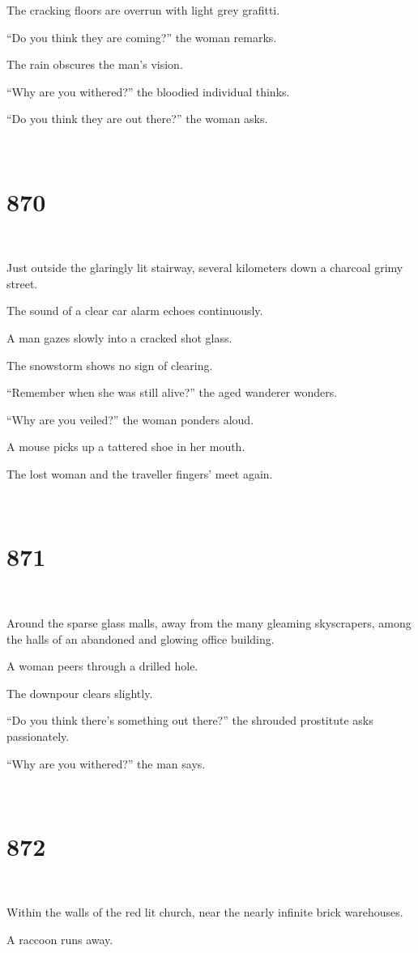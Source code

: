 \documentclass{report}
\begin{document}
The cracking floors are overrun with light grey grafitti.

``Do you think they are coming?'' the woman remarks.

The rain obscures the man's vision.

``Why are you withered?'' the bloodied individual thinks.

``Do you think they are out there?'' the woman asks.

~
\chapter*{870}
~

Just outside the glaringly lit stairway, several kilometers down a charcoal grimy street.

The sound of a clear car alarm echoes continuously.

A man gazes slowly into a cracked shot glass.

The snowstorm shows no sign of clearing.

``Remember when she was still alive?'' the aged wanderer wonders.

``Why are you veiled?'' the woman ponders aloud.

A mouse picks up a tattered shoe in her mouth.

The lost woman and the traveller fingers' meet again.

~
\chapter*{871}
~

Around the sparse glass malls, away from the many gleaming skyscrapers, among the halls of an abandoned and glowing office building.

A woman peers through a drilled hole.

The downpour clears slightly.

``Do you think there's something out there?'' the shrouded prostitute asks passionately.

``Why are you withered?'' the man says.

~
\chapter*{872}
~

Within the walls of the red lit church, near the nearly infinite brick warehouses.

A raccoon runs away.
\end{document}
